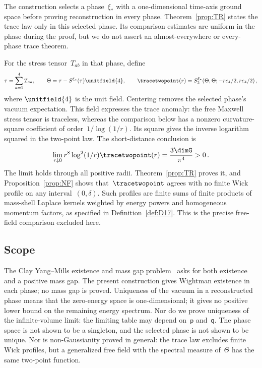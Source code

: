 The construction selects a phase~$\xi_*$ with a one-dimensional time-axis ground space before proving reconstruction in every phase. Theorem~\ref{prop:TR} states the trace law only in this selected phase. Its comparison estimates are uniform in the phase during the proof, but we do not assert an almost-everywhere or every-phase trace theorem.

For the stress tensor~$T_{ab}$ in that phase, define
\begin{equation*}
\tau=\sum_{a=1}^4T_{aa},\qquad
\Theta=\tau-S^{\xi_*}(\tau)\unitfield{4},\qquad
\tracetwopoint(r)=S_2^{\xi_*}(\Theta,\Theta;-re_4/2,re_4/2)\,,
\end{equation*}
where $\unitfield{4}$ is the unit field. Centering removes the selected phase's vacuum expectation. This field expresses the trace anomaly: the free Maxwell stress tensor is traceless, whereas the comparison below has a nonzero curvature-square coefficient of order~$1/\log(1/r)$. Its square gives the inverse logarithm squared in the two-point law. The short-distance conclusion is
\begin{equation}\label{eq:intro-trace-law}
\lim_{r\downarrow0}r^8\log^2(1/r)\tracetwopoint(r)=\frac{3\dimG}{\pi^4}>0\,.
\end{equation}
The limit holds through all positive radii. Theorem~\ref{prop:TR} proves it, and Proposition~\ref{prop:NF} shows that~$\tracetwopoint$ agrees with no finite Wick profile on any interval~$(0,\delta)$. Such profiles are finite sums of finite products of mass-shell Laplace kernels weighted by energy powers and homogeneous momentum factors, as specified in Definition~\ref{def:D17}. This is the precise free-field comparison excluded here.

\subsection{Scope}

The Clay Yang--Mills existence and mass gap problem~\cite[\S4]{JaffeWitten2006} asks for both existence and a positive mass gap. The present construction gives Wightman existence in each phase; no mass gap is proved. Uniqueness of the vacuum in a reconstructed phase means that the zero-energy space is one-dimensional; it gives no positive lower bound on the remaining energy spectrum. Nor do we prove uniqueness of the infinite-volume limit: the limiting table may depend on~$\mathsf p$ and~$\mathsf q$. The phase space is not shown to be a singleton, and the selected phase is not shown to be unique. Nor is non-Gaussianity proved in general: the trace law excludes finite Wick profiles, but a generalized free field with the spectral measure of~$\Theta$ has the same two-point function.

